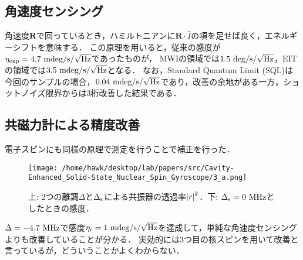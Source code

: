       \subsection{角速度センシング}
        角速度$\bm{R}$で回っているとき，ハミルトニアンに$\bm{R}\cdot \hat{I}$の項を足せば良く，エネルギーシフトを意味する．
        この原理を用いると，従来の感度が$\eta_{\mathrm{exp}} = 4.7\ \mathrm{mdeg / s / \sqrt{Hz}}$であったものが，
        MWIの領域では$1.5\ \mathrm{deg / s / \sqrt{Hz}}$，EITの領域では$3.5\ \mathrm{mdeg / s / \sqrt{Hz}}$となる．
        なお，Standard Quantum Limit (SQL)は今回のサンプルの場合，$0.04\ \mathrm{mdeg / s / \sqrt{Hz}}$であり，改善の余地がある一方，ショットノイズ限界からは3桁改善した結果である．
      \subsection{共磁力計による精度改善}
        電子スピンにも同様の原理で測定を行うことで補正を行った．
        \begin{figure}[H]
          \centering
          \texttt{[image: /home/hawk/desktop/lab/papers/src/Cavity-Enhanced\_Solid-State\_Nuclear\_Spin\_Gyroscope/3\_a.png]}
          \caption{上: 2つの離調$\Delta$と$\Delta_{\mathrm{s}}$による共振器の透過率$\abs{r}^2$．下: $\Delta_{\r{s}} = 0\ \r{MHz}$としたときの感度．}
        \end{figure}
        $\Delta = -4.7\ \mathrm{MHz}$で感度$\eta_{\r{r}} = 1\ \r{mdeg/s/\sqrt{Hz}}$を達成して，単純な角速度センシングよりも改善していることが分かる．
        実効的には3つ目の核スピンを用いて改善と言っているが，どういうことかよくわからない．
